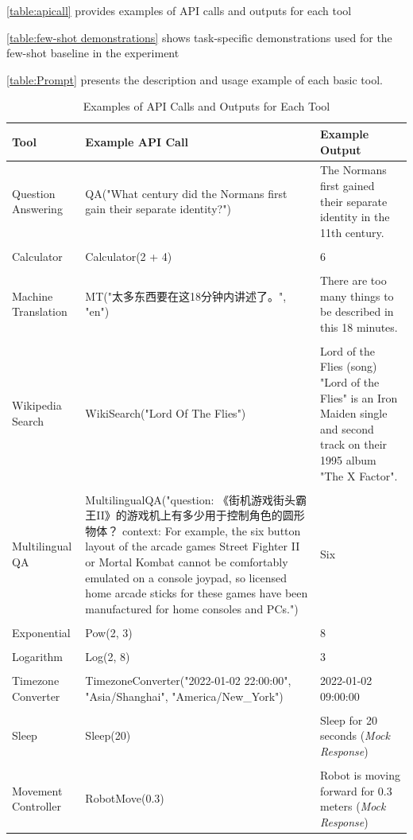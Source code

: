 \documentclass[11pt]{article}
\newcommand{\daniel}[1]{{\color{purple}[DK: #1]}}
\begin{document}
\autoref{table:apicall} provides examples of API calls and outputs for each tool

\noindent \autoref{table:few-shot demonstrations} shows task-specific demonstrations used for the few-shot baseline in the experiment

\noindent \autoref{table:Prompt} presents the description and usage example of each basic tool.

\begin{CJK*}{UTF8}{gbsn}
\begin{table}[h]
\begin{tabular}{p{}p{}p{}}
\toprule
\textbf{Tool} & \textbf{Example API Call} & \textbf{Example Output} \\ \midrule
Question Answering  & QA("What century did the Normans first gain their separate identity?") & The Normans first gained their separate identity in the 11th century. \\&&\\
Calculator & Calculator(2 + 4) & 6 \\&&\\
Machine Translation & MT("太多东西要在这18分钟内讲述了。", "en") & There are too many things to be described in this 18 minutes. \\&&\\
Wikipedia Search    & WikiSearch("Lord Of The Flies")  & Lord of the Flies (song) "Lord of the Flies" is an Iron Maiden single and second track on their 1995 album "The X Factor". \\&&\\
Multilingual QA & MultilingualQA("question: 《街机游戏街头霸王II》的游戏机上有多少用于控制角色的圆形物体？ context: For example, the six button layout of the arcade games Street Fighter II or Mortal Kombat cannot be comfortably emulated on a console joypad, so licensed home arcade sticks for these games have been manufactured for home consoles and PCs.") & Six \\&&\\
Exponential & Pow(2, 3) & 8 \\&&\\
Logarithm & Log(2, 8) & 3 \\&&\\
Timezone Converter &  TimezoneConverter("2022-01-02 22:00:00", "Asia/Shanghai", "America/New\_York")& 2022-01-02 09:00:00 \\&&\\
Sleep & Sleep(20) & Sleep for 20 seconds (\textit{Mock Response})\\&&\\
Movement Controller & RobotMove(0.3) & Robot is moving forward for 0.3 meters (\textit{Mock Response}) \\
\bottomrule
\end{tabular}
\caption{Examples of API Calls and Outputs for Each Tool}
\label{table:apicall}
\end{table}
\end{CJK*}
\end{document}
